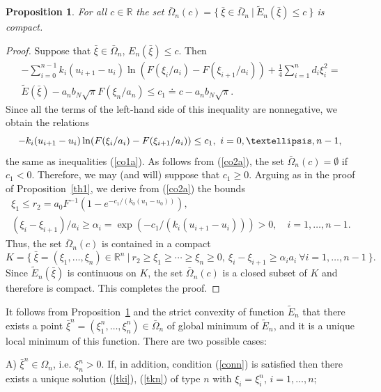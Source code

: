 \documentclass[10pt,a4paper]{amsart}
\newtheorem{proposition}{Proposition}[section]
\numberwithin{equation}{section}
\newcommand{\R}{{\mathbb R}}
\begin{document}
\begin{proposition}\label{th4}
For all $c\in\R$ the set $\bar\Omega_n(c)=\{ \ \bar\xi\in\bar\Omega_n \ | \ \tilde E_n(\bar\xi)\le c \ \}$ is compact.
\end{proposition}

\begin{proof}
Suppose that $\bar\xi\in\bar\Omega_n$, $E_n(\bar\xi)\le c$. Then
\begin{align*}
-\sum_{i=0}^{n-1}k_i(u_{i+1}-u_i)\ln (F(\xi_i/a_i)-F(\xi_{i+1}/a_i))+ \frac{1}{4}\sum_{i=1}^n d_i\xi_i^2= \\
\tilde E(\bar\xi)-a_nb_N\sqrt{\pi}F(\xi_n/a_n)\le c_1\doteq c-a_nb_N\sqrt{\pi}.
\end{align*}
Since all the terms of the left-hand side of this inequality are nonnegative, we obtain the relations
\begin{equation}\label{co2a}
-k_i(u_{i+1}-u_i)\ln (F(\xi_i/a_i)-F(\xi_{i+1}/a_i))\le c_1, \ i=0,\ldots,n-1, \\
\end{equation}
the same as inequalities (\ref{co1a}). As follows from (\ref{co2a}),  the set $\bar\Omega_n(c)=\emptyset$ if $c_1<0$. Therefore, we may (and will) suppose that $c_1\ge 0$. Arguing as in the proof of Proposition~\ref{th1}, we derive from (\ref{co2a}) the bounds
\begin{align*}
\xi_1\le r_2=a_0F^{-1}(1-e^{-c_1/(k_0(u_1-u_0))}), \\
(\xi_i-\xi_{i+1})/a_i\ge \alpha_i=\exp(-c_1/(k_i(u_{i+1}-u_i)))>0, \quad i=1,\ldots,n-1.
\end{align*}
Thus, the set $\bar\Omega_n(c)$ is contained in a compact
\[
K=\{ \ \bar\xi=(\xi_1,\ldots,\xi_n)\in\R^n \ | \ r_2\ge\xi_1\ge\cdots\ge\xi_n\ge 0, \ \xi_i-\xi_{i+1}\ge\alpha_i a_i \ \forall i=1,\ldots,n-1 \ \}.
\]
Since $\tilde E_n(\bar\xi)$ is continuous on $K$, the set $\bar\Omega_n(c)$ is a closed subset of $K$ and therefore is compact. This completes the proof.
\end{proof}

It follows from Proposition~\ref{th4} and the strict convexity of function $\tilde E_n$ that there exists a point
$\bar\xi^n=(\xi_1^n,\ldots,\xi_n^n)\in\bar\Omega_n$ of global minimum of $\tilde E_n$, and it is a unique local minimum of this function. There are two possible cases:

A) $\bar\xi^n\in\Omega_n$, i.e. $\xi_n^n>0$. If, in addition, condition (\ref{conn}) is satisfied then there exists a unique solution (\ref{tki}), (\ref{tkn}) of type $n$
with $\xi_i=\xi_i^n$, $i=1,\ldots,n$;
\end{document}

